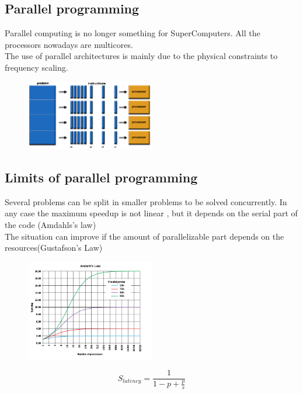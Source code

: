 \subsection{Parallel programming}

Parallel computing is no longer something for SuperComputers. All the processors nowadays are multicores.\\
The use of parallel architectures is mainly due to the physical constraints to
frequency scaling.

\begin{figure}[ht]
	\centering
	\includegraphics[width=0.5\textwidth]{figure_parallel/parallel_programming.png}\end{figure}
\FloatBarrier

\subsection{Limits of parallel programming}

Several problems can be split in
smaller problems to be solved
concurrently. In any case the maximum speedup is not linear , but it depends on the serial part of the code (Amdahls’s law)\\
The situation can improve if the
amount of parallelizable part
depends on the resources(Gustafson’s Law)

\begin{figure}[ht]
	\centering
	\includegraphics[width=0.5\textwidth]{figure_parallel/limits_parallel_programming.png}\end{figure}
\FloatBarrier

\begin{equation*}
	S_{latency} = \dfrac{1}{1-p+\frac{p}{s}}
\end{equation*}

